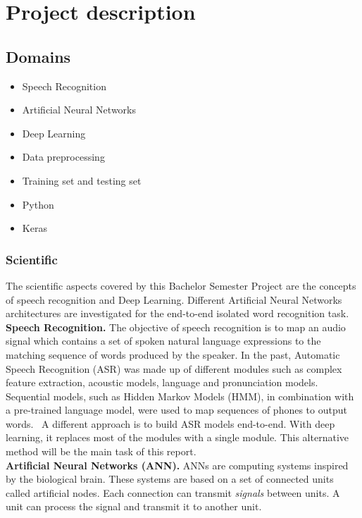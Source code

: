 
\section{Project description}
\subsection{Domains}

\begin{itemize}
        \item Speech Recognition
        \item Artificial Neural Networks
        \item Deep Learning 
        \item Data preprocessing
        \item Training set and testing set
        \item Python
        \item Keras
\end{itemize}

\subsubsection{Scientific}

The scientific aspects covered by this Bachelor Semester Project are the
concepts of speech recognition and Deep Learning. Different Artificial Neural
Networks architectures are investigated for the end-to-end isolated word
recognition task.\\

\textbf{Speech Recognition.} The objective of speech recognition is to map an
audio signal which contains a set of spoken natural language expressions to the
matching sequence of words produced by the speaker. In the past, Automatic
Speech Recognition (ASR) was made up of different modules such as complex
feature extraction, acoustic models, language and pronunciation
models.~\cite{DBLP:journals/corr/AmodeiABCCCCCCD15} Sequential models, such as
Hidden Markov Models (HMM), in combination with a pre-trained language model,
were used to map sequences of phones to output words.~\cite{Williamsong} A
different approach is to build ASR models end-to-end. With deep learning, it
replaces most of the modules with a single module. This alternative method will
be the main task of this report.\\

\textbf{Artificial Neural Networks (ANN).} ANNs are computing systems inspired
by the biological brain. These systems are based on a set of connected units
called artificial nodes. Each connection can transmit \textit{signals} between
units. A unit can process the signal and transmit it to another unit.\\

